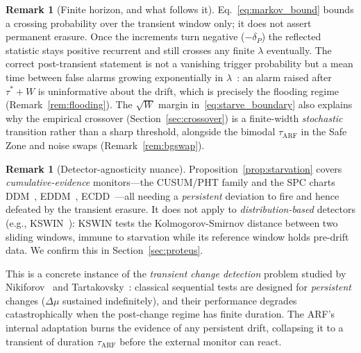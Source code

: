 \documentclass[10pt,conference]{IEEEtran}
\theoremstyle{definition}
\newtheorem{remark}[theorem]{Remark}
\begin{document}
\begin{remark}[Finite horizon, and what follows it]\label{rem:sufficient}
  Eq.~\eqref{eq:markov_bound} bounds a crossing probability over the transient window only; it does not assert permanent erasure. Once the increments turn negative ($-\delta_P$) the reflected statistic stays positive recurrent and still crosses any finite $\lambda$ eventually. The correct post-transient statement is not a vanishing trigger probability but a mean time between false alarms growing exponentially in $\lambda$~\cite{tartakovsky_2014,page_1954}: an alarm raised after $\tau^* + W$ is uninformative about the drift, which is precisely the flooding regime (Remark~\ref{rem:flooding}). The $\sqrt{W}$ margin in~\eqref{eq:starve_boundary} also explains why the empirical crossover (Section~\ref{sec:crossover}) is a finite-width \emph{stochastic} transition rather than a sharp threshold, alongside the bimodal $\tau_{\mathrm{ARF}}$ in the Safe Zone and noise swaps (Remark~\ref{rem:bgswap}).
\end{remark}

\begin{remark}[Detector-agnosticity nuance]\label{rem:agnostic}
  Proposition~\ref{prop:starvation} covers \emph{cumulative-evidence} monitors---the CUSUM/PHT family and the SPC charts DDM~\cite{gama_ddm_2004}, EDDM~\cite{baena_eddm_2006}, ECDD~\cite{ross_ecdd_2012}---all needing a \emph{persistent} deviation to fire and hence defeated by the transient erasure. It does not apply to \emph{distribution-based} detectors (e.g., KSWIN~\cite{raab_kswin_2020}): KSWIN tests the Kolmogorov-Smirnov distance between two sliding windows, immune to starvation while its reference window holds pre-drift data. We confirm this in Section~\ref{sec:proteus}.
\end{remark}

This is a concrete instance of the \emph{transient change detection} problem studied by Nikiforov~\cite{nikiforov_2012} and Tartakovsky~\cite{tartakovsky_2023_transient}: classical sequential tests are designed for \emph{persistent} changes ($\Delta\mu$ sustained indefinitely), and their performance degrades catastrophically when the post-change regime has finite duration.
The ARF's internal adaptation burns the evidence of any persistent drift, collapsing it to a transient of duration $\tau_{\mathrm{ARF}}$ before the external monitor can react.
\end{document}
